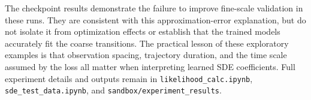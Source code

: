 The checkpoint results demonstrate the failure to improve fine-scale
validation in these runs. They are consistent with this approximation-error
explanation, but do not isolate it from optimization effects or establish that
the trained models accurately fit the coarse transitions. The practical lesson
of these exploratory examples is that observation spacing, trajectory duration,
and the time scale assumed by the loss all matter when interpreting learned
SDE coefficients. Full experiment details and outputs remain in
\texttt{likelihood\_calc.ipynb}, \texttt{sde\_test\_data.ipynb}, and
\texttt{sandbox/experiment\_results}.
